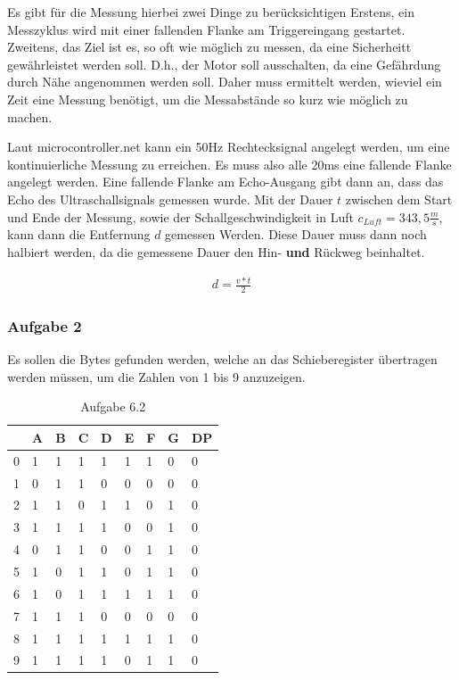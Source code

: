 Es gibt für die Messung hierbei zwei Dinge zu berücksichtigen
Erstens, ein Messzyklus wird mit einer fallenden Flanke am Triggereingang gestartet.
Zweitens, das Ziel ist es, so oft wie möglich zu messen, da eine Sicherheitt gewährleistet werden soll.
D.h., der Motor soll ausschalten, da eine Gefährdung durch Nähe angenommen werden soll.
Daher muss ermittelt werden, wieviel ein Zeit eine Messung benötigt, um die Messabstände so kurz wie möglich zu machen.

Laut microcontroller.net kann ein 50Hz Rechtecksignal angelegt werden, um eine kontinuierliche Messung zu erreichen.
Es muss also alle 20ms eine fallende Flanke angelegt werden.
Eine fallende Flanke am Echo-Ausgang gibt dann an, dass das Echo des Ultraschallsignals gemessen wurde.
Mit der Dauer $t$ zwischen dem Start und Ende der Messung, sowie der Schallgeschwindigkeit in Luft $c_{Luft}=343,5\frac{m}{s}$, kann dann die Entfernung $d$ gemessen Werden.
Diese Dauer muss dann noch halbiert werden, da die gemessene Dauer den Hin- \textbf{und} Rückweg beinhaltet.

\begin{align}
    d = \frac{v * t}{2}
\end{align}


\subsubsection{Aufgabe 2}

Es sollen die Bytes gefunden werden, welche an das Schieberegister übertragen werden müssen, um die Zahlen von 1 bis 9 anzuzeigen.

\begin{table}
    \centering
    \caption{Aufgabe 6.2}
    \label{tab:aufgabe-6-2}
    \begin{tabular}{| l ||  l | l | l | l | l | l | l | l |}
        \hline
          & A & B & C & D & E & F & G & DP \\
        \hline
        0 & 1 & 1 & 1 & 1 & 1 & 1 & 0 & 0 \\
        1 & 0 & 1 & 1 & 0 & 0 & 0 & 0 & 0 \\
        2 & 1 & 1 & 0 & 1 & 1 & 0 & 1 & 0 \\
        3 & 1 & 1 & 1 & 1 & 0 & 0 & 1 & 0 \\
        4 & 0 & 1 & 1 & 0 & 0 & 1 & 1 & 0 \\
        5 & 1 & 0 & 1 & 1 & 0 & 1 & 1 & 0 \\
        6 & 1 & 0 & 1 & 1 & 1 & 1 & 1 & 0\\
        7 & 1 & 1 & 1 & 0 & 0 & 0 & 0 & 0 \\
        8 & 1 & 1 & 1 & 1 & 1 & 1 & 1 & 0 \\
        9 & 1 & 1 & 1 & 1 & 0 & 1 & 1 & 0 \\
        \hline
    \end{tabular}
\end{table}


